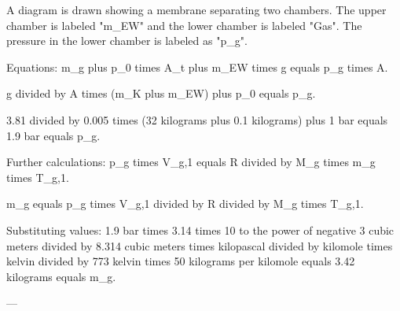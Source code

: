 A diagram is drawn showing a membrane separating two chambers. The upper chamber is labeled "m_EW" and the lower chamber is labeled "Gas". The pressure in the lower chamber is labeled as "p_g".  

Equations:  
m_g plus p_0 times A_t plus m_EW times g equals p_g times A.  

g divided by A times (m_K plus m_EW) plus p_0 equals p_g.  

3.81 divided by 0.005 times (32 kilograms plus 0.1 kilograms) plus 1 bar equals 1.9 bar equals p_g.  

Further calculations:  
p_g times V_g,1 equals R divided by M_g times m_g times T_g,1.  

m_g equals p_g times V_g,1 divided by R divided by M_g times T_g,1.  

Substituting values:  
1.9 bar times 3.14 times 10 to the power of negative 3 cubic meters divided by 8.314 cubic meters times kilopascal divided by kilomole times kelvin divided by 773 kelvin times 50 kilograms per kilomole equals 3.42 kilograms equals m_g.  

---